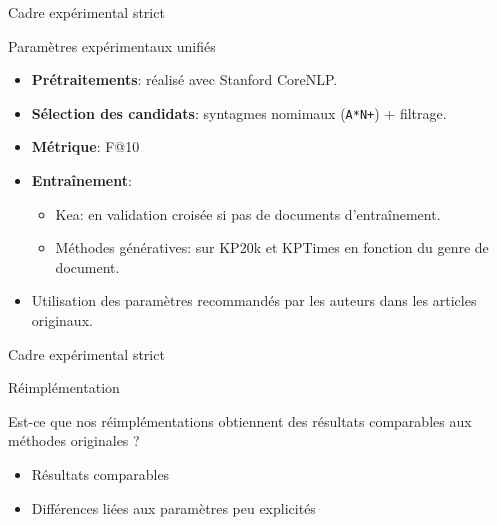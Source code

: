 \begin{frame}{Cadre expérimental strict}
    \begin{block}{Paramètres expérimentaux unifiés}
    \begin{itemize}
        \item \textbf{Prétraitements}: réalisé avec Stanford CoreNLP.
        \item \textbf{Sélection des candidats}: syntagmes nomimaux (\texttt{A*N+}) + filtrage. %
        \item \textbf{Métrique}: F@10
        
        \item \textbf{Entraînement}:
        \begin{itemize}
            \item Kea: en validation croisée si pas de documents d'entraînement.
            \item Méthodes génératives: sur KP20k et KPTimes en fonction du genre de document.
        \end{itemize}

        \item Utilisation des paramètres recommandés par les auteurs dans les articles originaux.
    \end{itemize}
    \end{block}
\end{frame}

\begin{frame}{Cadre expérimental strict}
    \begin{block}{Réimplémentation}
    
        Est-ce que nos réimplémentations obtiennent des résultats comparables aux méthodes originales ?
    
        
        
        \begin{itemize}
        \item Résultats comparables
            \item Différences liées aux paramètres peu explicités
        \end{itemize}
    \end{block}
\end{frame}

